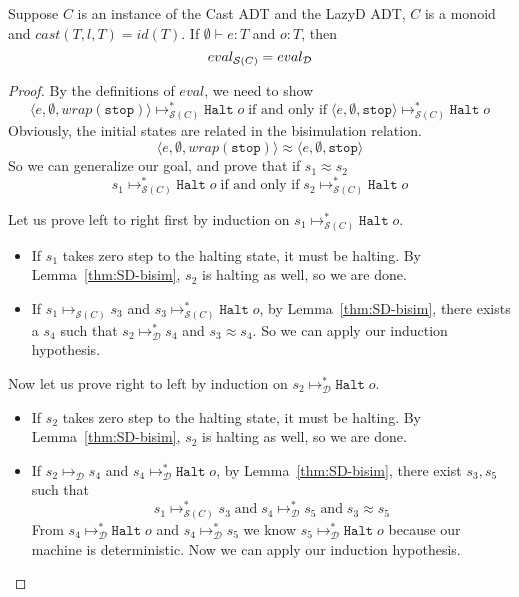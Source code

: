\documentclass[acmsmall,review,anonymous]{acmart}\settopmatter{printfolios=true,printccs=false,printacmref=false}
\newcommand{\judgetype}[3]{#1 \vdash #2 : #3}
\newcommand{\lazyD}{Lazy\;D}
\newcommand{\sOOinspect}[3]{\langle#1,#2,#3\rangle}
\newcommand{\sOOhalt}[1]{\mathtt{Halt} \; #1}
\newcommand{\kOOmt}[0]{\mathtt{stop}}
\newcommand{\judgeSreduce}[3]{#2 \longmapsto_{\mathcal{S}(#1)} #3}
\newcommand{\judgeSreduceTrans}[3]{#2 \longmapsto_{\mathcal{S}(#1)}^{*} #3}
\newcommand{\judgeSeval}[3]{eval_{\mathcal{S}(#1)}(#2) = #3}
\newcommand{\ineffCEKD}{\ensuremath{\mathcal{D}}}
\newcommand{\judgeDreduce}[2]{#1 \longmapsto_{\mathcal{D}} #2}
\newcommand{\judgeDreduceTrans}[2]{#1 \longmapsto_{\mathcal{D}}^{*} #2}
\newcommand{\judgeDeval}[2]{eval_{\mathcal{D}}(#1) = #2}
\newcommand{\effCEK}[1]{\ensuremath{\mathcal{S}(#1)}}
\newcommand{\evalEqv}[2]{\ensuremath{eval_{\text{#1}} = eval_{\text{#2}}}}
\begin{document}
\begin{corollary}[Correctness of \effCEK{C}]
  \label{thm:SD-equiv}
  Suppose $C$ is an instance of the Cast ADT
  and the \lazyD{} ADT, $C$ is a monoid
  and $cast(T,l,T)=id(T)$.
  If $\judgetype{\emptyset}{e}{T}$ and $o : T$, then
  \[
    \text{\evalEqv{\effCEK{C}}{\ineffCEKD}}
  \]
\end{corollary}
\begin{proof}
	By the definitions of $eval$, we need to show 
	\[
	\judgeSreduceTrans{C}{\sOOinspect{e}{\emptyset}{wrap(\kOOmt)}}{
		\sOOhalt{o}
	}
	\;\text{if and only if}\;
	\judgeSreduceTrans{C}{\sOOinspect{e}{\emptyset}{\kOOmt}}{
		\sOOhalt{o}
	}
	\]
	Obviously, the initial states are related in the bisimulation relation.
	\[
	\sOOinspect{e}{\emptyset}{wrap(\kOOmt)}
	\approx
	\sOOinspect{e}{\emptyset}{\kOOmt}
	\]
	So we can generalize our goal, and prove that if $s_1 \approx s_2$
	\[
	\judgeSreduceTrans{C}{s_1}{\sOOhalt{o}}
	\;\text{if and only if}\;
	\judgeSreduceTrans{C}{s_2}{\sOOhalt{o}}
	\]
	
	Let us prove left to right first by induction on 
	$\judgeSreduceTrans{C}{s_1}{\sOOhalt{o}}$.
	
	\begin{itemize}
		\item 
		If $s_1$ takes zero step to the halting state, it must be halting.
		By Lemma~\ref{thm:SD-bisim}, $s_2$ is halting as well, so we are done.
		\item 
		If $\judgeSreduce{C}{s_1}{s_3}$ and 
		$\judgeSreduceTrans{C}{s_3}{\sOOhalt{o}}$,
		by Lemma~\ref{thm:SD-bisim}, there exists a $s_4$ such that 
		$\judgeDreduceTrans{s_2}{s_4}$ and $s_3 \approx s_4$. So we can apply 
		our induction hypothesis.
	\end{itemize}
	
	Now let us prove right to left by induction on 
	$\judgeDreduceTrans{s_2}{\sOOhalt{o}}$.
	\begin{itemize}
		\item If $s_2$ takes zero step to the halting state, it must be halting.
		By Lemma~\ref{thm:SD-bisim}, $s_2$ is halting as well, so we are done.
		\item If $\judgeDreduce{s_2}{s_4}$ and 
		$\judgeDreduceTrans{s_4}{\sOOhalt{o}}$,
		by Lemma~\ref{thm:SD-bisim}, there exist $s_3,s_5$ such that
		\[
			\judgeSreduceTrans{C}{s_1}{s_3}
			\;\text{and}\;
			\judgeDreduceTrans{s_4}{s_5}
			\;\text{and}\;
			s_3 \approx s_5
		\]
		From $\judgeDreduceTrans{s_4}{\sOOhalt{o}}$ and 
		$\judgeDreduceTrans{s_4}{s_5}$ we know 
		$\judgeDreduceTrans{s_5}{\sOOhalt{o}}$ because our machine is 
		deterministic. Now we can apply our induction hypothesis.
	\end{itemize}
\end{proof}
\end{document}
